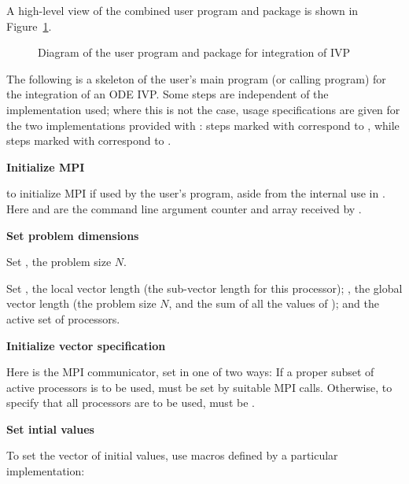 A high-level view of the combined user program and {\cvode} package is
shown in Figure~\ref{f:sim_overview}.
\begin{figure}
\centerline{}
\caption {Diagram of the user program and 
  {\cvode} package for integration of IVP}\label{f:sim_overview}
\end{figure}
The following is a skeleton of the user's main program (or calling
program) for the integration of an ODE IVP. Some steps are independent of the {\nvector}
implementation used; where this is not the case, usage specifications are given for the
two implementations provided with {\cvode}: steps marked with {\p} correspond to 
{\nvecp}, while steps marked with {\s} correspond to {\nvecs}.
\begin{Steps}
  
\item 
  {\bf {\p} Initialize MPI}

   to initialize MPI if used by
  the user's program, aside from the internal use in {\nvecp}.  
  Here  and  are the command line argument 
  counter and array received by .
  
\item
  {\bf Set problem dimensions}

  {\s} Set , the problem size $N$.

  {\p} Set , the local vector length (the sub-vector
  length for this processor); , the global vector length (the
  problem size $N$, and the sum of all the values of );
  and the active set of processors.
  
\item\label{i:nv_spec_init}
  {\bf Initialize vector specification}

  {\s} 

  {\p} 
  Here  is the MPI communicator, set in one of two ways: 
  If a proper subset of active processors is to be used,  
  must be set by suitable MPI calls. Otherwise, to specify that all 
  processors are to be used,  must be .
  
\item
  {\bf Set intial values}
 
  To set the vector  of initial values, use macros defined by a particular 
  {\nvector} implementation:


\end{Steps}

